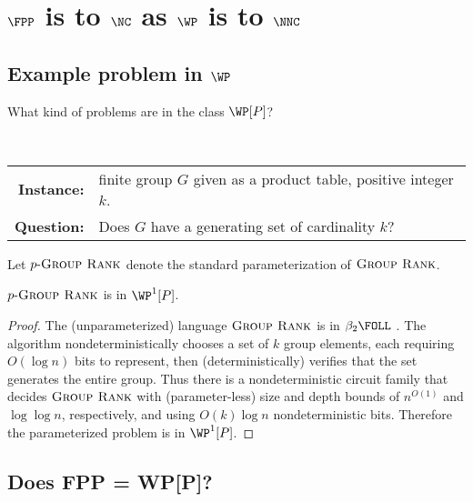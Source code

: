 \documentclass{article}
\newcommand{\dash}{\textnormal{-}}
\newcommand{\pgrouprank}{p\dash\textsc{Group Rank}}
\begin{document}

\section{\texorpdfstring{$\FPP$}{FPP} is to \texorpdfstring{$\NC$}{NC} as \texorpdfstring{$\WP$}{WP} is to \texorpdfstring{$\NNC$}{NNC}}

\subsection{Example problem in \texorpdfstring{$\WP$}{WP}}
\label{sec:rankinwp}

What kind of problems are in the class $\WP[P]$?

\begin{definition}
  \mbox{} \\
  \begin{tabular}{r p{9.2cm}}
    \textbf{Instance:} & finite group $G$ given as a product table, positive integer $k$. \\
    \textbf{Question:} & Does $G$ have a generating set of cardinality $k$?
  \end{tabular}
\end{definition}

Let $\pgrouprank$ denote the standard parameterization of $\textsc{Group Rank}$.

\begin{theorem}
  $\pgrouprank$ is in $\WP^1[P]$.
\end{theorem}
\begin{proof}
  The (unparameterized) language $\textsc{Group Rank}$ is in $\beta_2 \FOLL$ \autocite[Theorem~4.2]{grouprank}.
  The algorithm nondeterministically chooses a set of $k$ group elements, each requiring $O(\log n)$ bits to represent, then (deterministically) verifies that the set generates the entire group.
  Thus there is a nondeterministic circuit family that decides $\textsc{Group Rank}$ with (parameter-less) size and depth bounds of $n^{O(1)}$ and $\log \log n$, respectively, and using $O(k) \log n$ nondeterministic bits.
  Therefore the parameterized problem is in $\WP^1[P]$.
\end{proof}

\subsection{Does FPP = WP[P]?}
\end{document}
